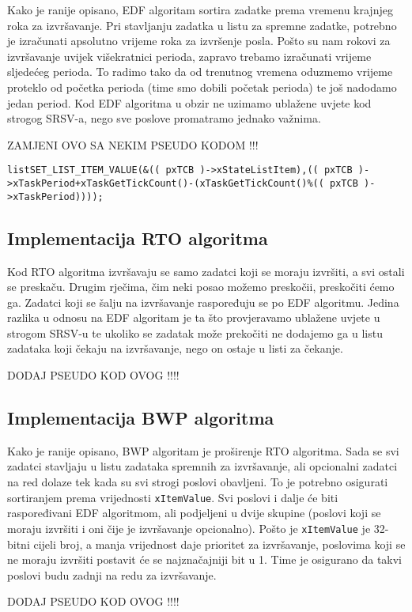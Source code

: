 \documentclass[../zavrsni.tex]{subfiles}
\begin{document}
Kako je ranije opisano, EDF algoritam sortira zadatke prema vremenu krajnjeg roka za izvršavanje. Pri stavljanju zadatka u 
listu za spremne zadatke, potrebno je izračunati apsolutno vrijeme roka za izvršenje posla. Pošto su nam rokovi za izvršavanje
uvijek višekratnici perioda, zapravo trebamo izračunati vrijeme sljedećeg perioda. To radimo tako da od trenutnog vremena 
oduzmemo vrijeme proteklo od početka perioda (time smo dobili početak perioda) te još nadodamo jedan period. Kod EDF algoritma
u obzir ne uzimamo ublažene uvjete kod strogog SRSV-a, nego sve poslove promatramo jednako važnima.

ZAMJENI OVO SA NEKIM PSEUDO KODOM !!!
\begin{lstlisting}[style=CStyle,caption={Računanje \texttt{xItemValue} vrijednosti za EDF algoritam},captionpos=b]
listSET_LIST_ITEM_VALUE(&(( pxTCB )->xStateListItem),(( pxTCB )->xTaskPeriod+xTaskGetTickCount()-(xTaskGetTickCount()%(( pxTCB )->xTaskPeriod))));
\end{lstlisting}


\subsection{Implementacija RTO algoritma}

Kod RTO algoritma izvršavaju se samo zadatci koji se moraju izvršiti, a svi ostali se preskaču. Drugim rječima, čim neki posao 
možemo preskočii, preskočiti ćemo ga. Zadatci koji se šalju na izvršavanje raspoređuju se po EDF algoritmu. Jedina razlika u odnosu
na EDF algoritam je ta što provjeravamo ublažene uvjete u strogom SRSV-u te ukoliko se zadatak može prekočiti ne dodajemo ga u 
listu zadataka koji čekaju na izvršavanje, nego on ostaje u listi za čekanje. 

DODAJ PSEUDO KOD OVOG !!!!

\subsection{Implementacija BWP algoritma}

Kako je ranije opisano, BWP algoritam je proširenje RTO algoritma. Sada se svi zadatci stavljaju u listu zadataka spremnih za izvršavanje,
ali opcionalni zadatci na red dolaze tek kada su svi strogi poslovi obavljeni. To je potrebno osigurati sortiranjem prema vrijednosti
\texttt{xItemValue}. Svi poslovi i dalje će biti raspoređivani EDF algoritmom, ali podjeljeni u dvije skupine (poslovi koji se moraju
izvršiti i oni čije je izvršavanje opcionalno). Pošto je \texttt{xItemValue} je 32-bitni cijeli broj, a manja vrijednost daje prioritet
za izvršavanje, poslovima koji se ne moraju izvršiti postavit će se najznačajniji bit u 1. Time je osigurano da takvi poslovi budu 
zadnji na redu za izvršavanje.  

DODAJ PSEUDO KOD OVOG !!!!
\end{document}
